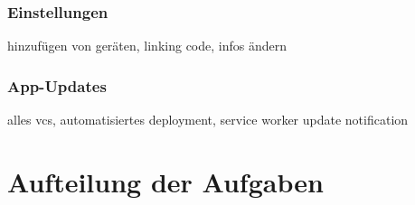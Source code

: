 \documentclass[a4paper]{article}
\begin{document}
\subsubsection{Einstellungen}
hinzufügen von geräten, linking code, infos ändern

\subsubsection{App-Updates}
alles vcs, automatisiertes deployment, service worker update notification


\section{Aufteilung der Aufgaben}

\addto{\captionsngerman}{\renewcommand*{\contentsname}{Mitglieder}}
\setcounter{tocdepth}{2}
\localtableofcontents
\addto{\captionsngerman}{\renewcommand*{\contentsname}{Inhaltsverzeichnis}}
\end{document}
